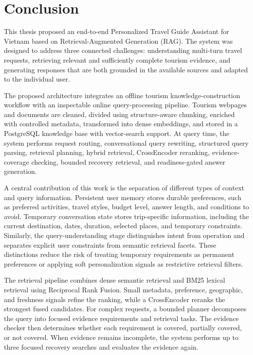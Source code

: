 \chapter{Conclusion}
\label{chap:conclusion}

This thesis proposed an end-to-end Personalized Travel Guide Assistant for
Vietnam based on Retrieval-Augmented Generation (RAG). The system was designed
to address three connected challenges: understanding multi-turn travel
requests, retrieving relevant and sufficiently complete tourism evidence, and
generating responses that are both grounded in the available sources and
adapted to the individual user.

The proposed architecture integrates an offline tourism knowledge-construction
workflow with an inspectable online query-processing pipeline. Tourism webpages
and documents are cleaned, divided using structure-aware chunking, enriched
with controlled metadata, transformed into dense embeddings, and stored in a
PostgreSQL knowledge base with vector-search support. At query time, the system
performs request routing, conversational query rewriting, structured query
parsing, retrieval planning, hybrid retrieval, CrossEncoder reranking,
evidence-coverage checking, bounded recovery retrieval, and readiness-gated
answer generation.

A central contribution of this work is the separation of different types of
context and query information. Persistent user memory stores durable
preferences, such as preferred activities, travel styles, budget level, answer
length, and conditions to avoid. Temporary conversation state stores
trip-specific information, including the current destination, dates, duration,
selected places, and temporary constraints. Similarly, the query-understanding
stage distinguishes intent from operation and separates explicit user
constraints from semantic retrieval facets. These distinctions reduce the risk
of treating temporary requirements as permanent preferences or applying soft
personalization signals as restrictive retrieval filters.

The retrieval pipeline combines dense semantic retrieval and BM25 lexical
retrieval using Reciprocal Rank Fusion. Small metadata, preference, geographic,
and freshness signals refine the ranking, while a CrossEncoder reranks the
strongest fused candidates. For complex requests, a bounded planner decomposes
the query into focused evidence requirements and retrieval tasks. The evidence
checker then determines whether each requirement is covered, partially covered,
or not covered. When evidence remains incomplete, the system performs up to
three focused recovery searches and evaluates the evidence again.

